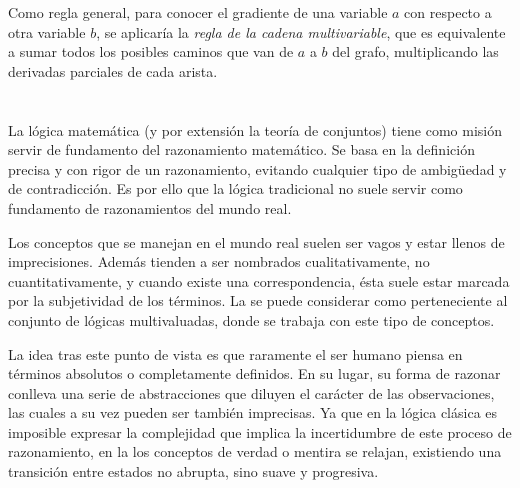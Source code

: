 Como regla general, para conocer el gradiente de una variable $a$ con respecto a otra variable $b$, se aplicaría la \textit{regla de la cadena multivariable}, que es equivalente a sumar todos los posibles caminos que van de $a$ a $b$ del grafo, multiplicando las derivadas parciales de cada arista.

\section{}

La lógica matemática (y por extensión la teoría de conjuntos) tiene como misión servir de fundamento del razonamiento matemático. Se basa en la definición precisa y con rigor de un razonamiento, evitando cualquier tipo de ambigüedad y de contradicción. Es por ello que la lógica tradicional no suele servir como fundamento de razonamientos del mundo real.

Los conceptos que se manejan en el mundo real suelen ser vagos y estar llenos de imprecisiones. Además tienden a ser nombrados cualitativamente, no cuantitativamente, y cuando existe una correspondencia, ésta suele estar marcada por la subjetividad de los términos. La  se puede considerar como perteneciente al conjunto de lógicas multivaluadas, donde se trabaja con este tipo de conceptos.

La idea tras este punto de vista es que raramente el ser humano piensa en términos absolutos o completamente definidos. En su lugar, su forma de razonar conlleva una serie de abstracciones que diluyen el carácter de las observaciones, las cuales a su vez pueden ser también imprecisas. Ya que en la lógica clásica es imposible expresar la complejidad que implica la incertidumbre de este proceso de razonamiento, en la  los conceptos de verdad o mentira se relajan, existiendo una transición entre estados no abrupta, sino suave y progresiva.

